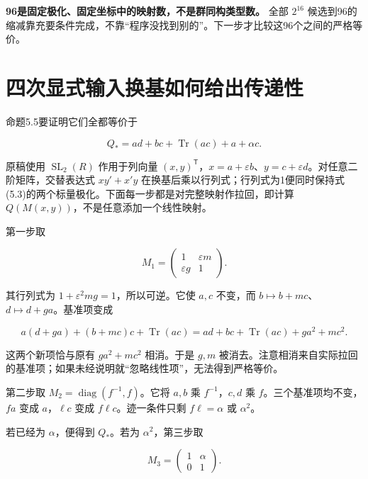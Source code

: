 \documentclass[UTF8,fontset=fandol,zihao=-4,openany,oneside]{ctexbook}
\begin{document}
\textbf{96是固定极化、固定坐标中的映射数，不是群同构类型数。} 全部 \(2^{16}\) 候选到96的缩减靠充要条件完成，不靠“程序没找到别的”。下一步才比较这96个之间的严格等价。



\section{四次显式输入换基如何给出传递性}


命题5.5要证明它们全都等价于



\[
Q_*=ad+bc+\operatorname{Tr}(ac)+a+\alpha c.
\]



原稿使用 \(\operatorname{SL}_2(R)\) 作用于列向量 \((x,y)^{\mathsf T}\)，\(x=a+\varepsilon b\)、\(y=c+\varepsilon d\)。对任意二阶矩阵，交替表达式 \(xy'+x'y\) 在换基后乘以行列式；行列式为1便同时保持式(5.3)的两个标量极化。下面每一步都是对完整映射作拉回，即计算 \(Q(M(x,y))\)，不是任意添加一个线性映射。



第一步取



\[
M_1=\begin{pmatrix}1&\varepsilon m\\ \varepsilon g&1\end{pmatrix}.
\]



其行列式为 \(1+\varepsilon^2mg=1\)，所以可逆。它使 \(a,c\) 不变，而 \(b\mapsto b+mc\)、\(d\mapsto d+ga\)。基准项变成



\[
a(d+ga)+(b+mc)c+\operatorname{Tr}(ac)
=ad+bc+\operatorname{Tr}(ac)+ga^2+mc^2.
\]



这两个新项恰与原有 \(ga^2+mc^2\) 相消。于是 \(g,m\) 被消去。注意相消来自实际拉回的基准项；如果未经说明就“忽略线性项”，无法得到严格等价。



第二步取 \(M_2=\operatorname{diag}(f^{-1},f)\)。它将 \(a,b\) 乘 \(f^{-1}\)，\(c,d\) 乘 \(f\)。三个基准项均不变，\(fa\) 变成 \(a\)，\(\ell c\) 变成 \(f\ell c\)。迹一条件只剩 \(f\ell=\alpha\) 或 \(\alpha^2\)。



若已经为 \(\alpha\)，便得到 \(Q_*\)。若为 \(\alpha^2\)，第三步取



\[
M_3=\begin{pmatrix}1&\alpha\\0&1\end{pmatrix}.
\]
\end{document}
